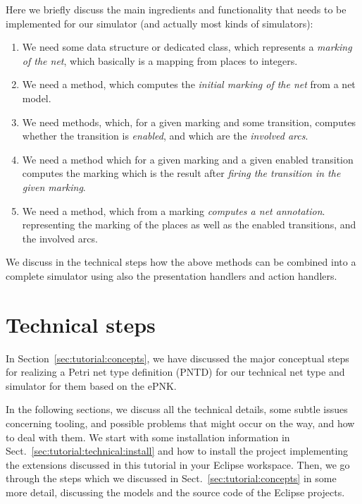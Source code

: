 Here we briefly discuss the main ingredients and functionality that
needs to be implemented for our simulator (and actually most kinds of
simulators):
\begin{enumerate}
\item We need some data structure or dedicated class, which represents 
      a \emph{marking of the net}, which basically is a mapping from places to
      integers.
\item We need a method, which computes the \emph{initial marking of the net}
      from a net model.
\item We need methods, which, for a given marking and some transition, computes
      whether the transition is \emph{enabled}, and which are the \emph{involved
      arcs}.
\item We need a method which for a given marking and a given enabled transition
      computes the marking which is the result after \emph{firing the
      transition in the given marking}. 
\item We need a method, which from a marking \emph{computes a net annotation}.
      representing the marking of the places as well as the enabled transitions,
      and the involved arcs.
\end{enumerate}

We discuss in the technical steps how the above methods can be combined
into a complete simulator using also the presentation handlers and action
handlers.

\section{Technical steps}
\label{sec:tutorial:technical}

In Section~\ref{sec:tutorial:concepts}, we have discussed the major conceptual
steps for realizing a Petri net type definition (PNTD) for our technical net
type and simulator for them based on the ePNK.

In the following sections, we discuss all the technical details, some subtle
issues concerning tooling, and possible problems that might occur on the way,
and how to deal with them. We start with some installation information in
Sect.~\ref{sec:tutorial:technical:install} and how to install the project
implementing the extensions discussed in this tutorial in your Eclipse workspace.
Then, we go through the steps which we discussed in
Sect.~\ref{sec:tutorial:concepts} in some more detail, discussing the models and
the source code of the Eclipse projects.

